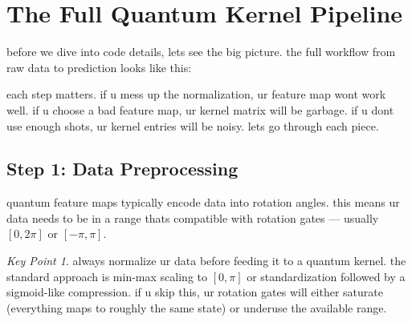 \documentclass[11pt,a4paper]{article}
\theoremstyle{definition}
\theoremstyle{remark}
\newtheorem*{keypoint}{Key Point}
\begin{document}
\section{The Full Quantum Kernel Pipeline}

before we dive into code details, lets see the big picture. the full workflow from raw data to prediction looks like this:

\begin{center}
\end{center}

each step matters. if u mess up the normalization, ur feature map wont work well. if u choose a bad feature map, ur kernel matrix will be garbage. if u dont use enough shots, ur kernel entries will be noisy. lets go through each piece.

\subsection{Step 1: Data Preprocessing}

quantum feature maps typically encode data into rotation angles. this means ur data needs to be in a range thats compatible with rotation gates --- usually $[0, 2\pi]$ or $[-\pi, \pi]$.

\begin{keypoint}
always normalize ur data before feeding it to a quantum kernel. the standard approach is min-max scaling to $[0, \pi]$ or standardization followed by a sigmoid-like compression. if u skip this, ur rotation gates will either saturate (everything maps to roughly the same state) or underuse the available range.
\end{keypoint}
\end{document}
